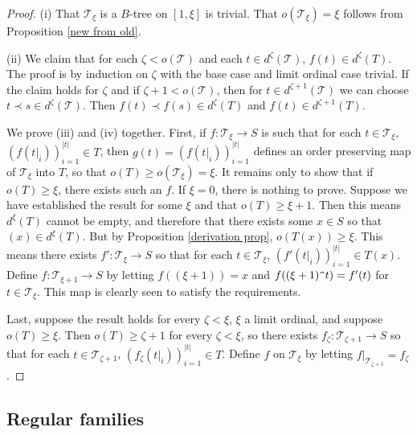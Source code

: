\documentclass[12pt]{amsart}
\theoremstyle{definition}
\newcommand{\ttt}{\mathcal{T}}
\begin{document}
\begin{proof}(i) That $\ttt_\xi$ is a $B$-tree on $[1,\xi]$ is trivial.  That $o(\ttt_\xi)=\xi$ follows from Proposition \ref{new from old}. 



(ii) We claim that for each $\zeta<o(\ttt)$ and each $t\in d^\zeta(\ttt)$, $f(t)\in d^\zeta(T)$.  The proof is by induction on $\zeta$ with the base case and limit ordinal case trivial.  If the claim holds for $\zeta$ and if $\zeta+1<o(\ttt)$, then for $t\in d^{\zeta+1}(\ttt)$ we can choose $t\prec s\in d^\zeta(\ttt)$.  Then $f(t)\prec f(s)\in d^\zeta(T)$ and $f(t)\in d^{\zeta+1}(T)$.  

We prove (iii) and (iv) together. First, if $f:\ttt_\xi\to S$ is such that for each $t\in \ttt_\xi$, $(f(t|_i))_{i=1}^{|t|}\in T$, then $g(t)=(f(t|_i))_{i=1}^{|t|}$ defines an order preserving map of $\ttt_\xi$ into $T$, so that $o(T)\geqslant o(\ttt_\xi)=\xi$.  It remains only to show that if $o(T)\geqslant \xi$, there exists such an $f$.  If $\xi=0$, there is nothing to prove.  Suppose we have established the result for some $\xi$ and that $o(T)\geqslant \xi+1$.  Then this means $d^\xi(T)$ cannot be empty, and therefore that there exists some $x\in S$ so that $(x)\in d^\xi(T)$.  But by Proposition \ref{derivation prop}, $o(T(x))\geqslant \xi$.  This means there exists $f':\ttt_\xi\to S$ so that for each $t\in \ttt_\xi$, $(f'(t|_i))_{i=1}^{|t|}\in T(x)$. Define $f:\ttt_{\xi+1}\to S$ by letting $f((\xi+1))=x$ and $f((\xi+1)\verb!^!t)=f'(t)$ for $t\in \ttt_\xi$.  This map is clearly seen to satisfy the requirements. 

Last, suppose the result holds for every $\zeta<\xi$, $\xi$ a limit ordinal, and suppose $o(T)\geqslant \xi$.  Then $o(T)\geqslant \zeta+1$ for every $\zeta<\xi$, so there exists $f_\zeta:\ttt_{\zeta+1}\to S$ so that for each $t\in \ttt_{\zeta+1}$, $(f_\zeta(t|_i))_{i=1}^{|t|}\in T$.  Define $f$ on $\ttt_\xi$ by letting $f|_{\ttt_{\zeta+1}}=f_\zeta$.  






\end{proof}










\subsection{Regular families}
\end{document}

